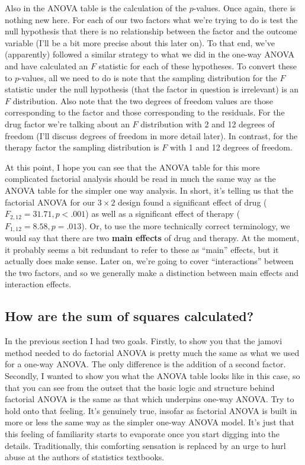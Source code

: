 \documentclass[
  a4paper,
]{book}
\begin{document}
Also in the ANOVA table is the calculation of the \(p\)-values. Once
again, there is nothing new here. For each of our two factors what we're
trying to do is test the null hypothesis that there is no relationship
between the factor and the outcome variable (I'll be a bit more precise
about this later on). To that end, we've (apparently) followed a similar
strategy to what we did in the one-way ANOVA and have calculated an
\(F\) statistic for each of these hypotheses. To convert these to
\(p\)-values, all we need to do is note that the sampling distribution
for the \(F\) statistic under the null hypothesis (that the factor in
question is irrelevant) is an \(F\) distribution. Also note that the two
degrees of freedom values are those corresponding to the factor and
those corresponding to the residuals. For the drug factor we're talking
about an \(F\) distribution with 2 and 12 degrees of freedom (I'll
discuss degrees of freedom in more detail later). In contrast, for the
therapy factor the sampling distribution is \(F\) with 1 and 12 degrees
of freedom.

At this point, I hope you can see that the ANOVA table for this more
complicated factorial analysis should be read in much the same way as
the ANOVA table for the simpler one way analysis. In short, it's telling
us that the factorial ANOVA for our \(3 \times 2\) design found a
significant effect of drug (\(F_{2,12} = 31.71, p < .001\)) as well as a
significant effect of therapy (\(F_{1,12} = 8.58, p = .013\)). Or, to
use the more technically correct terminology, we would say that there
are two \textbf{main effects} of drug and therapy. At the moment, it
probably seems a bit redundant to refer to these as ``main'' effects,
but it actually does make sense. Later on, we're going to cover
``interactions'' between the two factors, and so we generally make a
distinction between main effects and interaction effects.

\hypertarget{how-are-the-sum-of-squares-calculated}{%
\subsection{How are the sum of squares
calculated?}\label{how-are-the-sum-of-squares-calculated}}

In the previous section I had two goals. Firstly, to show you that the
jamovi method needed to do factorial ANOVA is pretty much the same as
what we used for a one-way ANOVA. The only difference is the addition of
a second factor. Secondly, I wanted to show you what the ANOVA table
looks like in this case, so that you can see from the outset that the
basic logic and structure behind factorial ANOVA is the same as that
which underpins one-way ANOVA. Try to hold onto that feeling. It's
genuinely true, insofar as factorial ANOVA is built in more or less the
same way as the simpler one-way ANOVA model. It's just that this feeling
of familiarity starts to evaporate once you start digging into the
details. Traditionally, this comforting sensation is replaced by an urge
to hurl abuse at the authors of statistics textbooks.
\end{document}
